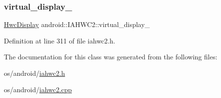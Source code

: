 \subsubsection{\texorpdfstring{virtual\+\_\+display\+\_\+}{virtual\_display\_}}
{\footnotesize\ttfamily \mbox{\hyperlink{classandroid_1_1IAHWC2_1_1HwcDisplay}{Hwc\+Display}} android\+::\+I\+A\+H\+W\+C2\+::virtual\+\_\+display\+\_\+}



Definition at line 311 of file iahwc2.\+h.



The documentation for this class was generated from the following files\+:\begin{DoxyCompactItemize}
\item 
os/android/\mbox{\hyperlink{iahwc2_8h}{iahwc2.\+h}}\item 
os/android/\mbox{\hyperlink{iahwc2_8cpp}{iahwc2.\+cpp}}\end{DoxyCompactItemize}
